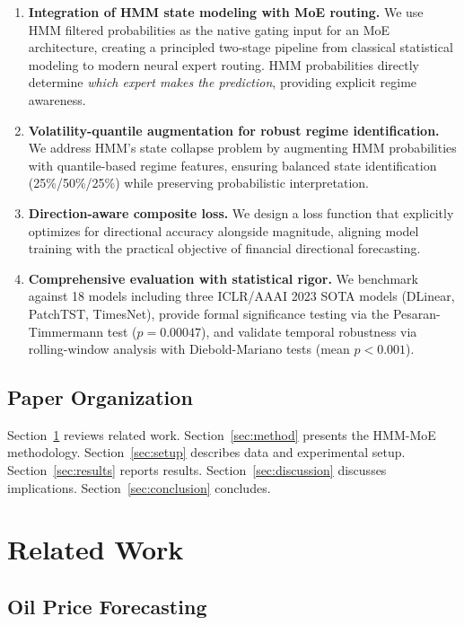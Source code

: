 \documentclass[3p,times]{elsarticle}
\begin{document}
\begin{enumerate}
\item \textbf{Integration of HMM state modeling with MoE routing.} We use HMM filtered probabilities as the native gating input for an MoE architecture, creating a principled two-stage pipeline from classical statistical modeling to modern neural expert routing. HMM probabilities directly determine \textit{which expert makes the prediction}, providing explicit regime awareness.

\item \textbf{Volatility-quantile augmentation for robust regime identification.} We address HMM's state collapse problem by augmenting HMM probabilities with quantile-based regime features, ensuring balanced state identification (25\%/50\%/25\%) while preserving probabilistic interpretation.

\item \textbf{Direction-aware composite loss.} We design a loss function that explicitly optimizes for directional accuracy alongside magnitude, aligning model training with the practical objective of financial directional forecasting.

\item \textbf{Comprehensive evaluation with statistical rigor.} We benchmark against 18 models including three ICLR/AAAI 2023 SOTA models (DLinear, PatchTST, TimesNet), provide formal significance testing via the Pesaran-Timmermann test ($p=0.00047$), and validate temporal robustness via rolling-window analysis with Diebold-Mariano tests (mean $p < 0.001$).
\end{enumerate}

\subsection{Paper Organization}

Section~\ref{sec:related} reviews related work. Section~\ref{sec:method} presents the HMM-MoE methodology. Section~\ref{sec:setup} describes data and experimental setup. Section~\ref{sec:results} reports results. Section~\ref{sec:discussion} discusses implications. Section~\ref{sec:conclusion} concludes.

\section{Related Work}
\label{sec:related}

\subsection{Oil Price Forecasting}
\end{document}
